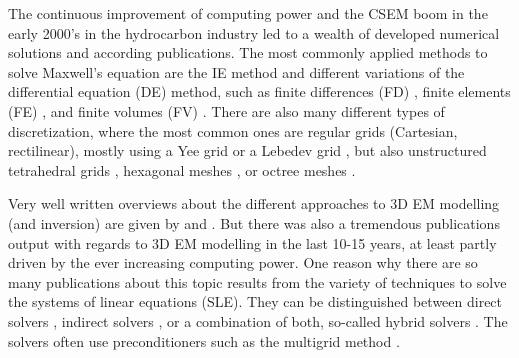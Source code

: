\documentclass[onecolumn,extra,camera]{gji}
\begin{document}
The continuous improvement of computing power and the CSEM boom in the early 2000's in the hydrocarbon industry led to a wealth of developed numerical solutions and according publications. The most commonly applied methods to solve Maxwell's equation are the IE method \citep{GJI.74.Raiche, RS.02.Hursan, GEO.06.Zhdanov, GP.10.Tehrani, CAG.16.Kruglyakov, MGS.17.Kruglyakov} and different variations of the differential equation (DE) method, such as finite differences (FD) \citep{GEO.93.Wang, RS.94.Druskin, RSC.94.Mackie, GEO.09.Streich, CAG.13.Sommer}, finite elements (FE) \citep{GEO.04.Commer, GJI.11.Schwarzbach,GEO.12.daSilva, GJI.13.Grayver, GJI.13.Puzyrev, SEG.16.Zhang}, and finite volumes (FV) \citep{EM.90.Madsen, SIAM.01.Haber, PIER.01.Clemens, GEO.14.Jahandari}. There are also many different types of discretization, where the most common ones are regular grids (Cartesian, rectilinear), mostly using a Yee grid \citep{IEEE.66.Yee} or a Lebedev grid \citep{CMMP.64.Lebedev}, but also unstructured tetrahedral grids \citep{SEG.16.Zhang, CAG.17.Cai}, hexagonal meshes \citep{CAG.14.Cai}, or octree meshes \citep{ECP.07.Haber}.

Very well written overviews about the different approaches to 3D EM modelling (and inversion) are given by \cite{SG.05.Avdeev} and \cite{SG.10.Borner}. But there was also a tremendous publications output with regards to 3D EM modelling in the last 10-15 years, at least partly driven by the ever increasing computing power. One reason why there are so many publications about this topic results from the variety of techniques to solve the systems of linear equations (SLE). They can be distinguished between direct solvers \citep{GEO.09.Streich, GP.14.Chung, GEO.14.Jaysaval, GEO.15.Grayver, SEG.15.Oh, GJI.18.Wang}, indirect solvers \citep{GP.06.Mulder, GJI.15.Jaysaval}, or a combination of both, so-called hybrid solvers \citep{GEO.18.Liu}. The solvers often use preconditioners such as the multigrid method \citep{SIAM.02.Aruliah, GJI.16.Jaysaval}.
\end{document}
